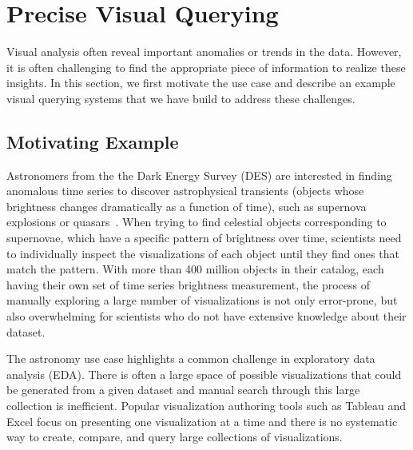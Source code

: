\section{Precise Visual Querying\label{sec:precise}}
Visual analysis often reveal important anomalies or trends in the data\cite{Morton2014}. However, it is often challenging to find the appropriate piece of information to realize these insights. In this section, we first motivate the use case and describe \zv an example visual querying systems that we have build to address these challenges.
\subsection{Motivating Example}
Astronomers from the the Dark Energy Survey (DES) are interested in finding anomalous time series to discover astrophysical transients (objects whose brightness changes dramatically as a function of time), such as supernova explosions or quasars~\cite{Drlica-Wagner2017}. When trying to find celestial objects corresponding to supernovae, which have a specific pattern of brightness over time, scientists need to individually inspect the visualizations of each object until they find ones that match the pattern. With more than 400 million objects in their catalog, each having their own set of time series brightness measurement, the process of manually exploring a large number of visualizations is not only error-prone, but also overwhelming for scientists who do not have extensive knowledge about their dataset.  
\par The astronomy use case highlights a common challenge in exploratory data analysis (EDA). There is often a large space of possible visualizations that could be generated from a given dataset and manual search through this large collection is inefficient. Popular visualization authoring tools such as Tableau and Excel focus on presenting one visualization at a time and there is no systematic way to create, compare, and query large collections of visualizations. 
